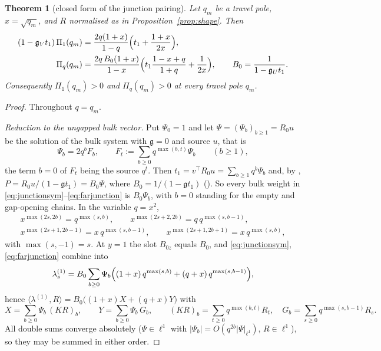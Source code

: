\documentclass[11pt]{article}
\theoremstyle{plain}
\newtheorem{theorem}{Theorem}
\theoremstyle{definition}
\theoremstyle{remark}
\theoremstyle{plain}\newtheorem*{maintheorem}{Main Theorem}
\begin{document}
\begin{theorem}[closed form of the junction pairing]\label{thm:RJ}
Let $q_m$ be a travel pole, $x=\sqrt{q_m}$, and $R$ normalised as in
Proposition~\ref{prop:shape}. Then
\begin{align}
   (1-\mathfrak g_Vt_1)\,\Pi_1(q_m)
     &=\frac{2q(1+x)}{1-q}\Bigl(t_1+\frac{1+x}{2x}\Bigr),\label{eq:RJclosed1}\\
   \Pi_q(q_m)
     &=\frac{2q\,B_0(1+x)}{1-x}\Bigl(t_1\frac{1-x+q}{1+q}+\frac1{2x}\Bigr),
     \qquad B_0=\frac1{1-\mathfrak g_Ut_1}. \label{eq:RJclosedq}
\end{align}
Consequently $\Pi_1(q_m)>0$ and $\Pi_q(q_m)>0$ at every travel pole $q_m$.
\end{theorem}

\begin{proof}
Throughout $q=q_m$.

\emph{Reduction to the ungapped bulk vector.} Put $\Psi_0=1$ and let $\Psi=(\Psi_b)_{b\ge1}=R_0u$ be
the solution of the bulk system with $\mathfrak g=0$ and source $u$, that is
\[
   \Psi_b=2q^bF_b,\qquad F_t:=\sum_{b\ge0}q^{\max(b,t)}\Psi_b\qquad(b\ge1),
\]
the term $b=0$ of $F_t$ being the source $q^t$. Then $t_1=v^{\!\top}R_0u=\sum_{b\ge1}q^b\Psi_b$ and,
by {\cite[\textup{(eq:smresolvent)}]{Bonfioli2026bB}}, $P=R_0u/(1-\mathfrak gt_1)=B_0\Psi$, where $B_0=1/(1-\mathfrak gt_1)$
({\cite[Remark ``the bulk sum of the model'', \textup{rem:bulksource}]{Bonfioli2026bB}}). So every bulk weight in \eqref{eq:junctionsym}--\eqref{eq:farjunction}
is $B_0\Psi_b$, with $b=0$ standing for the empty and gap-opening chains. In the variable $q=x^2$,
\[
 \begin{gathered}
   x^{\max(2s,2b)}=q^{\max(s,b)},\qquad x^{\max(2s+2,2b)}=q\,q^{\max(s,b-1)},\\
   x^{\max(2s+1,2b-1)}=x\,q^{\max(s,b-1)},\qquad x^{\max(2s+1,2b+1)}=x\,q^{\max(s,b)},
 \end{gathered}
\]
with $\max(s,-1)=s$. At $y=1$ the slot $B_{0z}$ equals $B_0$, and \eqref{eq:junctionsym},
\eqref{eq:farjunction} combine into
\begin{equation}\label{eq:lambdaPsi}
   \lambda^{(1)}_s=B_0\sum_{b\ge0}\Psi_b\Bigl((1+x)\,q^{\max(s,b)}+(q+x)\,q^{\max(s,b-1)}\Bigr),
\end{equation}
hence $\langle\lambda^{(1)},R\rangle=B_0\bigl((1+x)X+(q+x)Y\bigr)$ with
\[
   X=\sum_{b\ge0}\Psi_b\,(KR)_b,\qquad Y=\sum_{b\ge0}\Psi_b\,G_b,\qquad
   (KR)_b=\sum_{t\ge0}q^{\max(b,t)}R_t,\quad G_b=\sum_{s\ge0}q^{\max(s,b-1)}R_s .
\]
All double sums converge absolutely ($\Psi\in\ell^1$ with $|\Psi_b|=O(q^{2b}|\Psi|_{\ell^1})$,
$R\in\ell^1$), so they may be summed in either order.


\end{proof}
\end{document}
